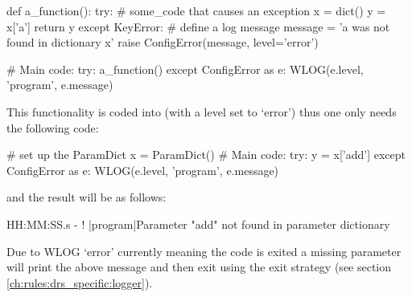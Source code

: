 \begin{pythonbox}
def a_function():
    try:
        # some_code that causes an exception
        x = dict()
        y = x['a']
        return y
    except KeyError:
        # define a log message
        message = 'a was not found in dictionary x'
        raise ConfigError(message, level='error')

# Main code:
try:
    a_function()
except ConfigError as e:
    WLOG(e.level, 'program', e.message)
\end{pythonbox}
\vspace{0.5cm}
\noindent This functionality is coded into \ParamDict (with a \WLOG level set to `error') thus one only needs the following code:
\begin{pythonbox}
# set up the ParamDict
x = ParamDict()
# Main code:
try:
    y = x['add']
except ConfigError as e:
    WLOG(e.level, 'program', e.message)
\end{pythonbox}
\noindent and the result will be as follows:
\begin{cmdboxprint}
HH:MM:SS.s - ! |program|Parameter "add" not found in parameter dictionary
\end{cmdboxprint}
\begin{note}
Due to WLOG `error' currently meaning the code is exited a missing parameter will print the above message and then exit using the  exit strategy (see section \ref{ch:rules:drs_specific:logger}).
\end{note}